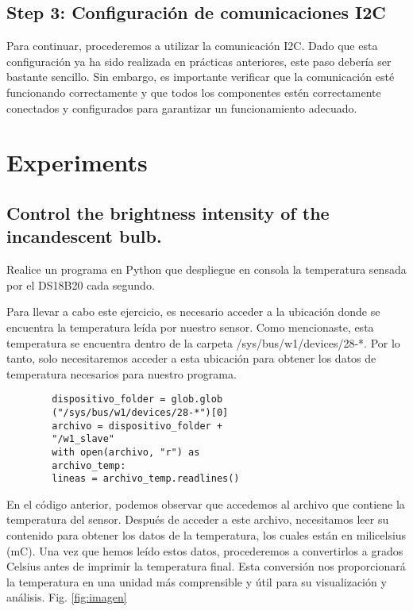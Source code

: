 \documentclass[letterpaper,12pt]{article}
\begin{document}
	
	\subsection{Step 3: Configuración de comunicaciones I2C }


	Para continuar, procederemos a utilizar la comunicación I2C. Dado que esta configuración ya ha sido realizada en prácticas anteriores, este paso debería ser bastante sencillo. Sin embargo, es importante verificar que la comunicación esté funcionando correctamente y que todos los componentes estén correctamente conectados y configurados para garantizar un funcionamiento adecuado.
	
	\section{Experiments}
	
	\subsection{Control the brightness intensity of the incandescent bulb. }

	Realice un programa en Python que despliegue en consola la temperatura sensada por el DS18B20 cada segundo.
	

	Para llevar a cabo este ejercicio, es necesario acceder a la ubicación donde se encuentra la temperatura leída por nuestro sensor. Como mencionaste, esta temperatura se encuentra dentro de la carpeta /sys/bus/w1/devices/28-*. Por lo tanto, solo necesitaremos acceder a esta ubicación para obtener los datos de temperatura necesarios para nuestro programa.
	\begin{verbatim}
		dispositivo_folder = glob.glob
		("/sys/bus/w1/devices/28-*")[0]
		archivo = dispositivo_folder + 
		"/w1_slave"
		with open(archivo, "r") as 
		archivo_temp:
		lineas = archivo_temp.readlines()
	\end{verbatim}
	
	En el código anterior, podemos observar que accedemos al archivo que contiene la temperatura del sensor. Después de acceder a este archivo, necesitamos leer su contenido para obtener los datos de la temperatura, los cuales están en milicelsius (mC). Una vez que hemos leído estos datos, procederemos a convertirlos a grados Celsius antes de imprimir la temperatura final. Esta conversión nos proporcionará la temperatura en una unidad más comprensible y útil para su visualización y análisis. Fig. \ref{fig:imagen}
	
\end{document}

